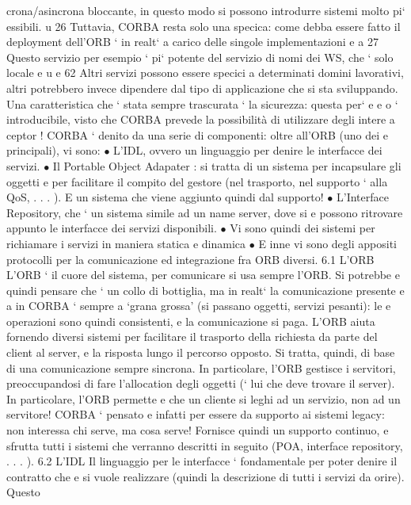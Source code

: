 \documentclass[a4paper,12pt]{article}
\begin{document}
crona/asincrona bloccante, in questo modo si possono introdurre sistemi
molto pi` essibili.
u
26 Tuttavia, CORBA resta solo una specica: come debba essere fatto il deployment
dell'ORB ` in realt` a carico delle singole implementazioni
e
a
27 Questo servizio per esempio ` pi` potente del servizio di nomi dei WS, che ` solo locale
e u
e
62
\newpage
Altri servizi possono essere specici a determinati domini lavorativi, altri potrebbero invece dipendere dal tipo di
applicazione che si sta sviluppando.
Una caratteristica che ` stata sempre trascurata ` la sicurezza: questa per`
e
e
o
` introducibile, visto che CORBA prevede la possibilità di utilizzare degli intere
a
ceptor !
CORBA ` denito da una serie di componenti: oltre all'ORB (uno dei
e
principali), vi sono:
$\bullet$ L'IDL, ovvero un linguaggio per denire le interfacce dei servizi.
$\bullet$ Il Portable Object Adapater : si tratta di un sistema per incapsulare gli
oggetti e per facilitare il compito del gestore (nel trasporto, nel supporto
`
alla QoS, . . . ). E un sistema che viene aggiunto quindi dal supporto!
$\bullet$ L'Interface Repository, che ` un sistema simile ad un name server, dove si
e
possono ritrovare appunto le interfacce dei servizi disponibili.
$\bullet$ Vi sono quindi dei sistemi per richiamare i servizi in maniera statica e
dinamica
$\bullet$ E inne vi sono degli appositi protocolli per la comunicazione ed integrazione fra ORB diversi.
6.1
L'ORB
L'ORB ` il cuore del sistema, per comunicare si usa sempre l'ORB. Si potrebbe
e
quindi pensare che ` un collo di bottiglia, ma in realt` la comunicazione presente
e
a
in CORBA ` sempre a {`}grana grossa' (si passano oggetti, servizi pesanti): le
e
operazioni sono quindi consistenti, e la comunicazione si paga. L'ORB aiuta
fornendo diversi sistemi per facilitare il trasporto della richiesta da parte del
client al server, e la risposta lungo il percorso opposto. Si tratta, quindi, di base
di una comunicazione sempre sincrona.
In particolare, l'ORB gestisce i servitori, preoccupandosi di fare l'allocation
degli oggetti (` lui che deve trovare il server). In particolare, l'ORB permette
e
che un cliente si leghi ad un servizio, non ad un servitore! CORBA ` pensato
e
infatti per essere da supporto ai sistemi legacy: non interessa chi serve, ma
cosa serve! Fornisce quindi un supporto continuo, e sfrutta tutti i sistemi che
verranno descritti in seguito (POA, interface repository, . . . ).
6.2
L'IDL
Il linguaggio per le interfacce ` fondamentale per poter denire il contratto che
e
si vuole realizzare (quindi la descrizione di tutti i servizi da orire). Questo
\end{document}
